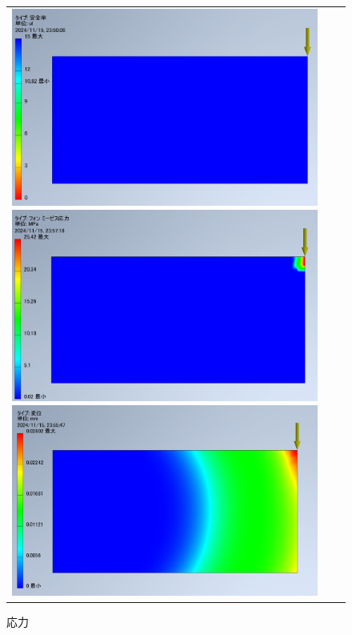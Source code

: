     \begin{figure}[H]
      \begin{tabular}{ccc}
        \begin{minipage}{.33\textwidth}
          \centering
          \includegraphics[width=0.99\linewidth]{images/model_1/safe.png}
          \caption{安全率}
          \label{img:safe1}
        \end{minipage}
        \begin{minipage}{.33\textwidth}
          \centering
          \includegraphics[width=0.99\linewidth]{images/model_1/voms.png}
          \caption{応力}
          \label{img:voms1}
        \end{minipage}
        \begin{minipage}{.33\textwidth}
          \centering
          \includegraphics[width=0.99\linewidth]{images/model_1/disp.png}

\end{minipage}
\end{tabular}
\end{figure}

